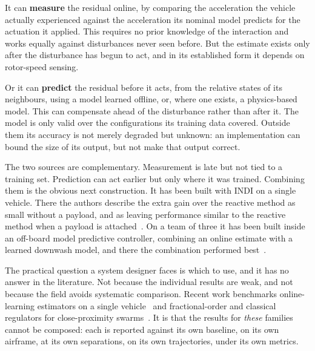 It can \textbf{measure} the residual online, by comparing the acceleration the vehicle actually
experienced against the acceleration its nominal model predicts for the actuation it applied. This
requires no prior knowledge of the interaction and works equally against disturbances never seen
before. But the estimate exists only after the disturbance has begun to act, and in its established
form it depends on rotor-speed sensing.

Or it can \textbf{predict} the residual before it acts, from the relative states of its neighbours,
using a model learned offline, or, where one exists, a physics-based model. This can compensate
ahead of the disturbance rather than after it.
The model is only valid over the configurations its training data covered. Outside them its
accuracy is not merely degraded but unknown: an implementation can bound the size of its output,
but not make that output correct.

The two sources are complementary. Measurement is late but not tied to a training set. Prediction
can act earlier but only where it was trained. Combining them is the obvious next construction. It
has been built with INDI on a single vehicle. There the authors describe the extra gain over the reactive
method as small without a payload, and as leaving performance similar to the reactive method when a
payload is attached~\cite{cobobriesewitz2026lindi}. On a team of three it has been built inside an
off-board model predictive controller, combining an online estimate with a learned downwash model,
and there the combination performed best~\cite{hsieh2025onlineadaptation}.

The practical question a system designer faces is which to use, and it has no answer in the
literature. Not because the individual results are weak, and not because the field avoids
systematic comparison. Recent work benchmarks online-learning estimators on a single
vehicle~\cite{gu2025comparative} and fractional-order and classical regulators for close-proximity
swarms~\cite{abro2025fractional}. It is that the results for \emph{these} families cannot be
composed: each is reported against its own baseline, on its own airframe, at its own separations,
on its own trajectories, under its own metrics.

